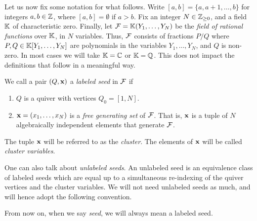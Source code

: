 Let us now fix some notation for what follows. Write $[a,b] = \{a, a + 1, \dots, b\}$
for integers $a,b \in \mathbb{Z}$, where $[a,b] = \emptyset$ if $a > b$. Fix an integer $N
	\in \mathbb{Z}_{\geq 0}$, and a field $\mathbb{K}$ of characteristic zero. Finally, let $\mathcal{F} =
	\mathbb{K} (Y_1, \dots, Y_N)$ be the \emph{field of rational functions} over $\mathbb{K}$, in $N$ variables. Thus, $\mathcal{F}$ consists of fractions $P/Q$
where $P, Q\in \mathbb{K}[Y_1, \dots, Y_N]$ are polynomials in the variables $Y_1, \dots,
	Y_N$, and $Q$ is non-zero. In most cases we will take $\mathbb{K} = \mathbb{C}$ or $\mathbb{K} = \mathbb{Q}$.
This does not impact the definitions that follow in a meaningful way.

\begin{definition}
	We call a pair $(Q, \mathbf{x})$ a \emph{labeled seed} in $\mathcal{F}$ if
	\begin{enumerate}
		\item $Q$ is a quiver with vertices $Q_0 = [1, N]$.
		\item $\mathbf{x} = (x_1, \dots, x_N)$ is a \emph{free generating set} of $\mathcal{F}$. That is, $\mathbf{x}$ is a tuple of $N$ algebraically independent elements that generate $\mathcal{F}$.
	\end{enumerate}
	The tuple $\mathbf{x}$ will be referred to as the \emph{cluster}. The elements of $\mathbf{x}$ will be called \emph{cluster variables}.
\end{definition}
%
One can also talk about \emph{unlabeled seeds}. An unlabeled seed
is an equivalence class of labeled seeds which are equal up to a simultaneous
re-indexing of the quiver vertices and the cluster variables. We will not need
unlabeled seeds as much, and will hence adopt the following convention.
\begin{convention}
	From now on, when we say \emph{seed}, we will always mean a labeled seed.
\end{convention}

